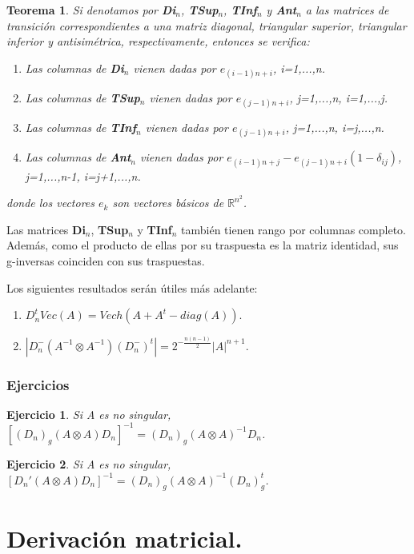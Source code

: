 \documentclass{article}
\theoremstyle{theorem-style}  %
\newtheorem{theorem}{Teorema}[section]  %
\theoremstyle{definition-style}
\theoremstyle{example-style}
\theoremstyle{exercise-style}
\newtheorem{exercise}{Ejercicio}[section]
\begin{document}
	\begin{theorem}
		Si denotamos por \textbf{Di$_n$}, \textbf{TSup$_n$}, \textbf{TInf$_n$} y \textbf{Ant$_n$} a las matrices de transición correspondientes a una matriz diagonal, triangular superior, triangular inferior y antisimétrica, respectivamente, entonces se verifica:
		\begin{enumerate}
			\item Las columnas de \textbf{Di$_n$} vienen dadas por $e_{(i-1)n+i}$, i=1,...,n.
			\item Las columnas de \textbf{TSup$_n$} vienen dadas por $e_{(j-1)n+i}$, j=1,...,n, i=1,...,j.
			\item Las columnas de \textbf{TInf$_n$} vienen dadas por $e_{(j-1)n+i}$, j=1,...,n, i=j,...,n.
			\item Las columnas de \textbf{Ant$_n$} vienen dadas por $e_{(i-1)n+j}-e_{(j-1)n+i}(1-\delta_{ij})$, j=1,...,n-1, i=j+1,...,n.
		\end{enumerate}
		donde los vectores $e_k$ son vectores básicos de $\mathbb{R}^{n^2}$.
	\end{theorem}
	
	Las matrices \textbf{Di$_n$}, \textbf{TSup$_n$} y \textbf{TInf$_n$} también tienen rango por columnas completo. Además, como el producto de ellas por su traspuesta es la matriz identidad, sus g-inversas coinciden con sus traspuestas.
	
	Los siguientes resultados serán útiles más adelante:
	\begin{enumerate}
		\item $D_n^tVec(A) = Vech(A+A^t-diag(A))$.
		\item $|D_n^-(A^{-1}\otimes A^{-1})(D_n^-)^t| = 2^{-\frac{n(n-1)}{2}}|A|^{n+1}$.
	\end{enumerate}
	
	\subsubsection{Ejercicios}
	\begin{exercise}
		Si A es no singular, $[(D_n)_g(A\otimes A)D_n]^{-1} = (D_n)_g(A\otimes A)^{-1}D_n$.
	\end{exercise}
	
	\begin{exercise}
		Si A es no singular, $[D_n'(A\otimes A)D_n]^{-1} = (D_n)_g(A\otimes A)^{-1}(D_n)^t_g$.
	\end{exercise}
	
	\newpage	
	\section{Derivación matricial.}
	
\end{document}
